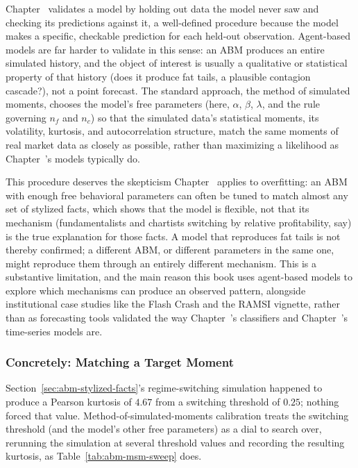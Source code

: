 \documentclass[../ai_in_finance]{subfiles}
\begin{document}
Chapter~ validates a model by holding out data the model never saw and checking its predictions against it, a well-defined procedure because the model makes a specific, checkable prediction for each held-out observation. Agent-based models are far harder to validate in this sense: an ABM produces an entire simulated history, and the object of interest is usually a qualitative or statistical property of that history (does it produce fat tails, a plausible contagion cascade?), not a point forecast. The standard approach, the method of simulated moments, chooses the model's free parameters (here, $\alpha$, $\beta$, $\lambda$, and the rule governing $n_f$ and $n_c$) so that the simulated data's statistical moments, its volatility, kurtosis, and autocorrelation structure, match the same moments of real market data as closely as possible, rather than maximizing a likelihood as Chapter~'s models typically do.

This procedure deserves the skepticism Chapter~ applies to overfitting: an ABM with enough free behavioral parameters can often be tuned to match almost any set of stylized facts, which shows that the model is flexible, not that its mechanism (fundamentalists and chartists switching by relative profitability, say) is the true explanation for those facts. A model that reproduces fat tails is not thereby confirmed; a different ABM, or different parameters in the same one, might reproduce them through an entirely different mechanism. This is a substantive limitation, and the main reason this book uses agent-based models to explore which mechanisms can produce an observed pattern, alongside institutional case studies like the Flash Crash and the RAMSI vignette, rather than as forecasting tools validated the way Chapter~'s classifiers and Chapter~'s time-series models are.

\subsubsection*{Concretely: Matching a Target Moment}

Section~\ref{sec:abm-stylized-facts}'s regime-switching simulation happened to produce a Pearson kurtosis of $4.67$ from a switching threshold of $0.25$; nothing forced that value. Method-of-simulated-moments calibration treats the switching threshold (and the model's other free parameters) as a dial to search over, rerunning the simulation at several threshold values and recording the resulting kurtosis, as Table~\ref{tab:abm-msm-sweep} does.
\end{document}
